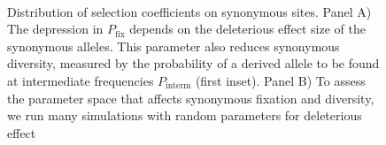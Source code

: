 \documentclass[rmp, twocolumn]{revtex4}
\begin{document}
\begin{figure}
\begin{center}
\\
\caption{Distribution of selection coefficients on synonymous sites. Panel A)
The depression in $P_\text{fix}$ depends on the deleterious effect size 
of the synonymous alleles. This parameter also reduces synonymous
diversity, measured by the probability of a derived allele to be found at
intermediate frequencies $P_\text{interm}$ (first inset).
Panel B) To assess the parameter space that affects synonymous fixation and
diversity, we run many simulations with random parameters for deleterious effect
}
\end{center}
\end{figure}
\end{document}
